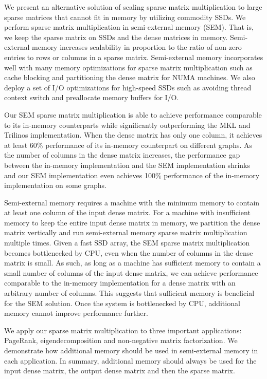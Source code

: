 We present an alternative solution of scaling sparse matrix multiplication
to large sparse matrices that cannot fit in memory by utilizing commodity SSDs.
We perform sparse matrix multiplication in semi-external memory (SEM). That is,
we keep the sparse matrix on SSDs and the dense matrices in memory. Semi-external
memory increases scalability in proportion to the ratio of non-zero entries
to rows or columns in a sparse matrix. Semi-external
memory incorporates well with many memory optimizations for sparse matrix
multiplication such as cache blocking and partitioning the dense matrix for
NUMA machines. We also deploy a set of I/O optimizations for high-speed SSDs
such as avoiding thread context switch and preallocate memory buffers for I/O.

Our SEM sparse matrix multiplication is able to achieve performance
comparable to its in-memory counterparts while significantly outperforming
the MKL and Trilinos implementation. When the dense matrix has only one column,
it achieves at least 60\% performance of its in-memory counterpart on different
graphs. As the number of columns in the dense matrix increases, the performance
gap between the in-memory implementation and the SEM implementation shrinks and
our SEM implementation even achieves 100\% performance of the in-memory implementation
on some graphs.

Semi-external memory requires a machine with the minimum memory to contain
at least one column of the input dense matrix. For a machine with insufficient memory
to keep the entire input dense matrix in memory, we partition the dense matrix
vertically and run semi-external memory sparse matrix multiplication multiple
times. Given a fast SSD array, the SEM sparse matrix multiplication becomes
bottlenecked by CPU, even when the number of columns in the dense matrix
is small. As such, as long as a machine has sufficient memory to contain
a small number of columns of the input dense matrix, we can achieve performance
comparable to the in-memory implementation for a dense matrix with an arbitrary
number of columns. This suggests that sufficient memory is beneficial for
the SEM solution. Once the system is bottlenecked by CPU, additional memory
cannot improve performance further.

We apply our sparse matrix multiplication to three important applications:
PageRank, eigendecomposition and non-negative matrix factorization. We demonstrate
how additional memory should be used in semi-external memory in each application.
In summary, additional memory should always be used for the input dense matrix,
the output dense matrix and then the sparse matrix.

